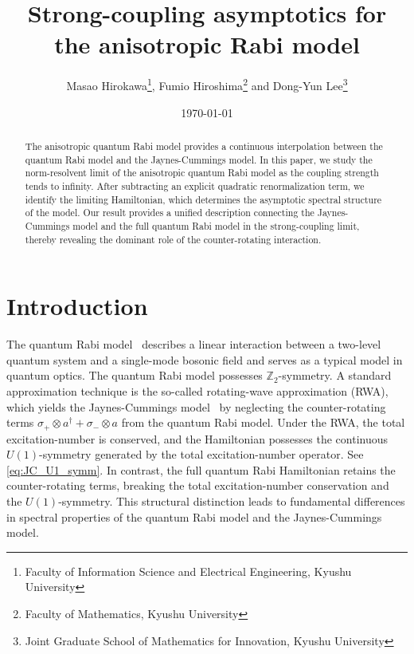 \documentclass[12pt,dvipdfmx]{article}
\newcommand{\ZZ}{\mathbb{Z}}
\begin{document}
\title{\sc Strong-coupling asymptotics for \\ the anisotropic Rabi model}
\author{
    Masao Hirokawa\footnote{Faculty of Information Science and Electrical Engineering, Kyushu University},  
    Fumio Hiroshima\footnote{Faculty of Mathematics, Kyushu University} and 
    Dong-Yun Lee\footnote{Joint Graduate School of Mathematics for Innovation, Kyushu University}
}
\date{\today}
\maketitle
%
%
%
\begin{abstract}
The anisotropic quantum Rabi model provides a continuous interpolation between the quantum Rabi model and the Jaynes-Cummings model. In this paper, we study the norm-resolvent limit of the anisotropic quantum Rabi model as the coupling strength tends to infinity. After subtracting an explicit quadratic renormalization term, we identify the limiting Hamiltonian, which determines the asymptotic spectral structure of the model. Our result provides a unified description connecting the Jaynes-Cummings model and the full quantum Rabi model in the strong-coupling limit, thereby revealing the dominant role of the counter-rotating interaction.
\end{abstract}
%
%
\tableofcontents
%
\section{Introduction}
%
%
%
The quantum Rabi model~\cite{Rabi36} describes a linear interaction between a two-level quantum system and a single-mode bosonic field and serves as a typical  model in quantum optics.  The quantum Rabi model possesses  $\ZZ_2$-symmetry. 
A standard approximation technique is the so-called rotating-wave approximation (RWA), which yields the Jaynes-Cummings model~\cite{JC63, SK93} by neglecting the counter-rotating terms $\sigma_+ \otimes a^\dagger + \sigma_- \otimes a$ from the quantum Rabi model. Under the RWA, 
the total excitation-number is conserved, and the Hamiltonian possesses the continuous $U(1)$-symmetry generated by the total excitation-number operator.  See \eqref{eq:JC_U1_symm}. In contrast, the full quantum Rabi Hamiltonian retains the counter-rotating terms, breaking the total excitation-number conservation and the $U(1)$-symmetry. %
This structural distinction leads to fundamental differences in spectral properties of  
the quantum Rabi model and the Jaynes-Cummings model. 
\end{document}
